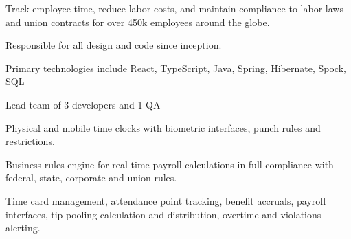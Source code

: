 \documentclass[]{deedy-resume}
\begin{document}
\begin{minipage}[t]{1.0\textwidth}
Track employee time, reduce labor costs, and maintain compliance to labor laws and union contracts for over 450k employees around the globe.
\begin{tightemize}
\item Responsible for all design and code since inception. 
\item Primary technologies include React, TypeScript, Java, Spring, Hibernate, Spock, SQL
\item Lead team of 3 developers and 1 QA
\item Physical and mobile time clocks with biometric interfaces, punch rules and restrictions.
\item Business rules engine for real time payroll calculations in full compliance with federal, state, corporate and union rules.
\item Time card management, attendance point tracking, benefit accruals, payroll interfaces, tip pooling calculation and distribution, overtime and violations alerting. 
\end{tightemize}
\sectionsep

\end{minipage} 
 
\end{document}

